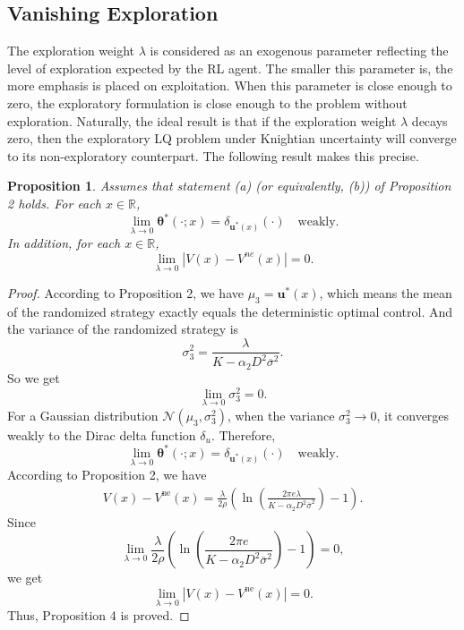 \documentclass[onecolumn, journal]{IEEEtran} %
\newtheorem{proposition}{Proposition}
\begin{document}
	\subsection{Vanishing Exploration}
	The exploration weight $\lambda$ is considered as an exogenous parameter reflecting the level of exploration expected by the RL agent. The smaller this parameter is, the more emphasis is placed on exploitation. When this parameter is close enough to zero, the exploratory formulation is close enough to the problem without exploration. Naturally, the ideal result is that if the exploration weight $\lambda$ decays zero, then the exploratory LQ problem under Knightian uncertainty will converge to its non-exploratory counterpart. The following result makes this precise.
	\begin{proposition}
		Assumes that statement (a) (or equivalently, (b)) of Proposition 2 holds. For each $x \in \mathbb{R}$,
		\[
		\lim_{\lambda \to 0} \boldsymbol{\theta}^*(\cdot; x) = \delta_{\boldsymbol{u}^*(x)}(\cdot) \quad \text{weakly}.
		\]
		In addition, for each $x \in \mathbb{R}$,
		\[
		\lim_{\lambda \to 0} |V(x) - V^{ne}(x)| = 0.
		\]
	\end{proposition}
	\begin{proof}
		According to Proposition 2, we have $\mu_3 = \boldsymbol{u}^*(x)$, which means the mean of the randomized strategy exactly equals the deterministic optimal control. And the variance of the randomized strategy is
		\[\sigma_3^2 = \frac{\lambda}{K - \alpha_2D^2\overline{\sigma}^2}.
		\]
		So we get
		\begin{equation*}
			\lim_{\lambda \to 0} \sigma_3^2 = 0.
		\end{equation*}
		For a Gaussian distribution $\mathcal{N}(\mu_3, \sigma_3^2)$, when the variance $\sigma_3^2 \to 0$, it converges weakly to the Dirac delta function $\delta_u$. Therefore, 
		\[
		\lim_{\lambda \to 0} \boldsymbol{\theta}^*(\cdot; x) = \delta_{\boldsymbol{u}^*(x)}(\cdot) \quad \text{weakly}.
		\]
		According to Proposition 2, we have
		\begin{align*}
			V(x) - V^{\text{ne}}(x) = \frac{\lambda}{2\rho} \left( \ln \left( \frac{2\pi e \lambda}{K - \alpha_2 D^2 \overline{\sigma}^2} \right) - 1 \right).
		\end{align*}
		Since
		\[
		\lim_{\lambda \to 0} \frac{\lambda}{2\rho} \left( \ln \left( \frac{2\pi e}{K - \alpha_2 D^2 \overline{\sigma}^2} \right) - 1 \right) = 0,
		\]
		we get
		\[
		\lim_{\lambda \to 0} \left| V(x) - V^{\text{ne}}(x) \right| = 0.
		\]
		Thus, Proposition 4 is proved.
	\end{proof}
\end{document}
